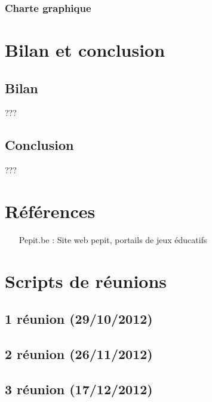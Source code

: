 \documentclass[french]{report}
\begin{document}
\subsection{Charte graphique}


\chapter*{Bilan et conclusion}
\section*{Bilan}
???
\section*{Conclusion}
???



\appendix 


\chapter{Références}
\begin{itemize}
\item[Pepit.be :] Site web pepit, portails de jeux éducatifs
\end{itemize}


\chapter{Scripts de réunions}
\section*{1\iere{} réunion (29/10/2012)}
\label{reunion1}

\section*{2\ieme{} réunion (26/11/2012)}

\section*{3\ieme{} réunion (17/12/2012)}

\end{document}
